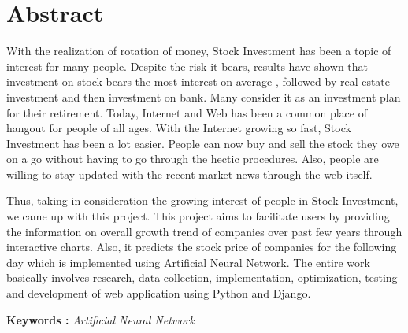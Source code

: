 


\newpage
\section*{Abstract}
With the realization of rotation of money, Stock Investment has been a topic of interest for many people. Despite the risk it bears, results have shown that investment on stock bears the most interest on average , followed by real-estate investment and then investment on bank. Many consider it as an investment plan for their retirement. Today, Internet and Web has been a common place of hangout for people of all ages. With the Internet growing so fast, Stock Investment has been a lot easier. People can now buy and sell the stock they owe on a go without having to go through the hectic procedures. Also, people are willing to stay updated with the recent market news through the web itself. 

Thus, taking in consideration the growing interest of people in Stock Investment, we came up with this project. This project aims to facilitate users by providing the information on overall growth trend of companies over past few years through interactive charts. Also, it predicts the stock price of companies for the following day which is implemented using Artificial Neural Network. The entire work basically involves research, data collection, implementation, optimization, testing and development of web application using Python and Django.

\textbf{Keywords :}\textit{ Artificial Neural Network}



